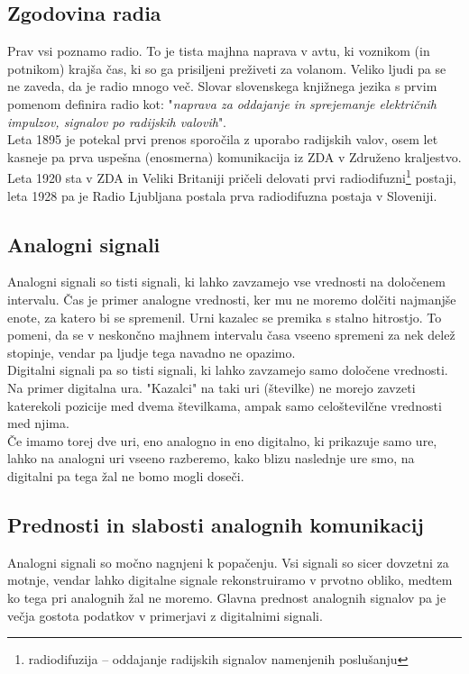 \documentclass[12pt]{article}
\begin{document}
    \subsection{Zgodovina radia}
        Prav vsi poznamo radio. To je tista majhna naprava v avtu, ki 
        voznikom (in potnikom) krajša čas, ki so ga prisiljeni preživeti za
        volanom. Veliko ljudi pa se ne zaveda, da je radio mnogo več. Slovar
        slovenskega knjižnega jezika s prvim pomenom definira radio
        kot: "\textit{naprava za oddajanje in sprejemanje električnih 
        impulzov, signalov po radijskih valovih}". \cite{SSKJ-radio}\\
        Leta 1895 \cite{ppt} je potekal prvi prenos sporočila z uporabo
        radijskih valov, osem let kasneje pa prva uspešna (enosmerna) 
        komunikacija iz ZDA v Združeno kraljestvo. Leta 1920 sta v ZDA in 
        Veliki Britaniji pričeli delovati prvi radiodifuzni\footnote{
        radiodifuzija – oddajanje radijskih signalov namenjenih poslušanju} 
        postaji, leta 1928 pa je Radio Ljubljana postala prva radiodifuzna 
        postaja v Sloveniji.
    \subsection{Analogni signali}
        Analogni signali so tisti signali, ki lahko zavzamejo vse vrednosti
        na določenem intervalu. Čas je primer analogne vrednosti, ker mu ne
        moremo dolčiti najmanjše enote, za katero bi se spremenil. Urni
        kazalec se premika s stalno hitrostjo. To pomeni, da se v neskončno
        majhnem intervalu časa vseeno spremeni za nek delež stopinje, vendar
        pa ljudje tega navadno ne opazimo.\\
        Digitalni signali pa so tisti signali, ki lahko zavzamejo samo 
        določene vrednosti. Na primer digitalna ura. "Kazalci" na taki uri 
        (številke) ne morejo zavzeti katerekoli pozicije med dvema 
        številkama, ampak samo celoštevilčne vrednosti med njima.\\
        Če imamo torej dve uri, eno analogno in eno digitalno, ki prikazuje
        samo ure, lahko na analogni uri vseeno razberemo, kako blizu 
        naslednje ure smo, na digitalni pa tega žal ne bomo mogli doseči.
    \subsection{Prednosti in slabosti analognih komunikacij}
        Analogni signali so močno nagnjeni k popačenju. Vsi signali so sicer 
        dovzetni za motnje, vendar lahko digitalne signale rekonstruiramo v 
        prvotno obliko, medtem ko tega pri analognih žal ne moremo. Glavna 
        prednost analognih signalov pa je večja gostota podatkov v primerjavi z
        digitalnimi signali.
\end{document}
